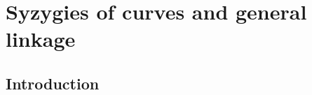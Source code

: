 

\chapter{Syzygies  of curves and general linkage}
\label{SyzygiesChapter}

%
%
%
%
%
\def\length{{\rm length}}

\section{Introduction} 

%
%

